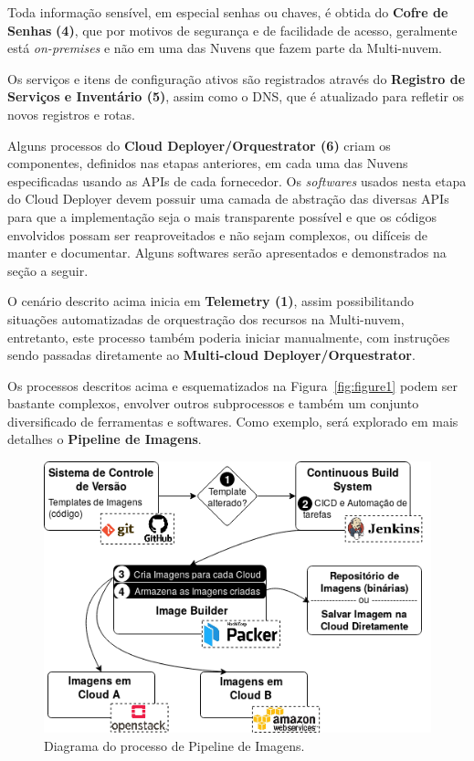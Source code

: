 \documentclass[12pt]{article}
\begin{document}
	Toda informação sensível, em especial senhas ou chaves, é obtida do \textbf{Cofre de Senhas} \textbf{(4)}, que por motivos de segurança e de facilidade de acesso, geralmente está \textit{on-premises} e não em uma das Nuvens que fazem parte da Multi-nuvem.   
	
	Os serviços e itens de configuração ativos são registrados através do  \textbf{Registro de Serviços e Inventário (5)}, assim como o DNS, que é atualizado para refletir os novos registros e rotas.
	
	Alguns processos do \textbf{Cloud Deployer/Orquestrator (6)} criam os componentes, definidos nas etapas anteriores, em cada uma das Nuvens especificadas usando as APIs de cada fornecedor. Os \textit{softwares} usados nesta etapa do Cloud Deployer devem possuir uma camada de abstração das diversas APIs para que a implementação seja o mais transparente possível e que os códigos envolvidos possam ser reaproveitados e não sejam complexos, ou difíceis de manter e documentar. Alguns softwares serão apresentados e demonstrados na seção a seguir.  

	O cenário descrito acima inicia em \textbf{Telemetry (1)}, assim possibilitando situações automatizadas de orquestração dos recursos na Multi-nuvem, entretanto, este processo também poderia iniciar manualmente, com instruções  sendo passadas diretamente ao \textbf{Multi-cloud Deployer/Orquestrator}.  
	
	Os processos descritos acima e esquematizados na Figura~\ref{fig:figure1} podem ser bastante complexos, envolver outros subprocessos e também um conjunto diversificado de ferramentas e softwares. Como exemplo, será explorado em mais detalhes o \textbf{Pipeline de Imagens}.
		
	\begin{figure}[ht]
		\centering
		\includegraphics[width=0.7\linewidth]{figuras/Figure2.png}
		\caption{Diagrama do processo de Pipeline de Imagens.}
		\label{fig:figure2}
	\end{figure}
    
\end{document}
